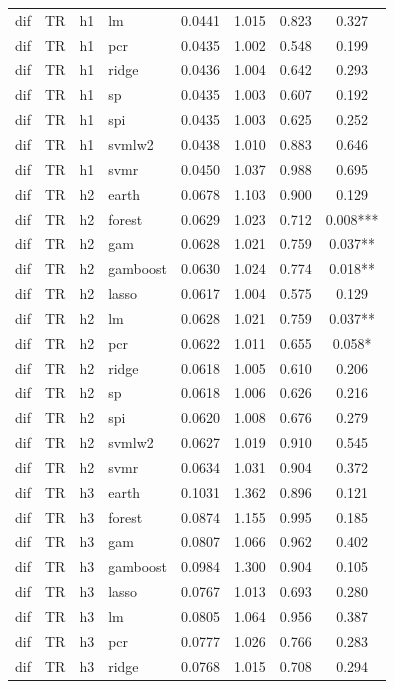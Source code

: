 \begin{ThreePartTable}
\begin{longtable}[t]{llclcccc}
dif & TR & h1 & lm & 0.0441 & 1.015 & 0.823 & 0.327\\
dif & TR & h1 & pcr & 0.0435 & 1.002 & 0.548 & 0.199\\
dif & TR & h1 & ridge & 0.0436 & 1.004 & 0.642 & 0.293\\
dif & TR & h1 & sp & 0.0435 & 1.003 & 0.607 & 0.192\\
dif & TR & h1 & spi & 0.0435 & 1.003 & 0.625 & 0.252\\
dif & TR & h1 & svmlw2 & 0.0438 & 1.010 & 0.883 & 0.646\\
dif & TR & h1 & svmr & 0.0450 & 1.037 & 0.988 & 0.695\\
\addlinespace
dif & TR & h2 & earth & 0.0678 & 1.103 & 0.900 & 0.129\\
dif & TR & h2 & forest & 0.0629 & 1.023 & 0.712 & 0.008***\\
dif & TR & h2 & gam & 0.0628 & 1.021 & 0.759 & 0.037**\\
dif & TR & h2 & gamboost & 0.0630 & 1.024 & 0.774 & 0.018**\\
dif & TR & h2 & lasso & 0.0617 & 1.004 & 0.575 & 0.129\\
dif & TR & h2 & lm & 0.0628 & 1.021 & 0.759 & 0.037**\\
dif & TR & h2 & pcr & 0.0622 & 1.011 & 0.655 & 0.058*\\
dif & TR & h2 & ridge & 0.0618 & 1.005 & 0.610 & 0.206\\
dif & TR & h2 & sp & 0.0618 & 1.006 & 0.626 & 0.216\\
dif & TR & h2 & spi & 0.0620 & 1.008 & 0.676 & 0.279\\
dif & TR & h2 & svmlw2 & 0.0627 & 1.019 & 0.910 & 0.545\\
dif & TR & h2 & svmr & 0.0634 & 1.031 & 0.904 & 0.372\\
\addlinespace
dif & TR & h3 & earth & 0.1031 & 1.362 & 0.896 & 0.121\\
dif & TR & h3 & forest & 0.0874 & 1.155 & 0.995 & 0.185\\
dif & TR & h3 & gam & 0.0807 & 1.066 & 0.962 & 0.402\\
dif & TR & h3 & gamboost & 0.0984 & 1.300 & 0.904 & 0.105\\
dif & TR & h3 & lasso & 0.0767 & 1.013 & 0.693 & 0.280\\
dif & TR & h3 & lm & 0.0805 & 1.064 & 0.956 & 0.387\\
dif & TR & h3 & pcr & 0.0777 & 1.026 & 0.766 & 0.283\\
dif & TR & h3 & ridge & 0.0768 & 1.015 & 0.708 & 0.294\\

\end{longtable}
\end{ThreePartTable}
